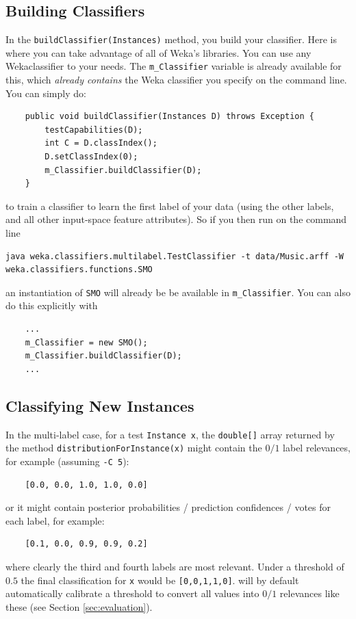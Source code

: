 \documentclass[11pt]{article}
\newcommand{\MEKA}{Meka}
\newcommand{\WEKA}{Weka}
\begin{document}
\subsection{Building Classifiers}

In the \texttt{buildClassifier(Instances)} method, you build your classifier. Here is where you can take advantage of all of \WEKA's libraries. You can use any \WEKA classifier to your needs. The \texttt{m\_Classifier} variable is already available for this, which \textit{already contains} the \WEKA{} classifier you specify on the command line. You can simply do:
\begin{verbatim}
    public void buildClassifier(Instances D) throws Exception {
        testCapabilities(D);
        int C = D.classIndex();
		D.setClassIndex(0);
		m_Classifier.buildClassifier(D);
    }
\end{verbatim}
to train a classifier to learn the first label of your data (using the other labels, and all other input-space feature attributes). So if you then run on the command line
\begin{verbatim}
java weka.classifiers.multilabel.TestClassifier -t data/Music.arff -W weka.classifiers.functions.SMO
\end{verbatim}
an instantiation of \texttt{SMO} will already be be available in \texttt{m_Classifier}. You can also do this explicitly with
\begin{verbatim}
	...
    m_Classifier = new SMO();
	m_Classifier.buildClassifier(D);
	...
\end{verbatim}

\subsection{Classifying New Instances}

In the multi-label case, for a test \texttt{Instance x}, the \texttt{double[]} array returned by the method \texttt{distributionForInstance(x)} might contain the $0/1$ label relevances, for example (assuming \texttt{-C 5}):
\begin{verbatim}
	[0.0, 0.0, 1.0, 1.0, 0.0]
\end{verbatim} 
or it might contain posterior probabilities / prediction confidences / votes for each label, for example:
\begin{verbatim}
	[0.1, 0.0, 0.9, 0.9, 0.2]
\end{verbatim} 
where clearly the third and fourth labels are most relevant. Under a threshold of $0.5$ the final classification for \texttt{x} would be \texttt{[0,0,1,1,0]}. \framework{\MEKA} will by default automatically calibrate a threshold to convert all values into $0/1$ relevances like these (see Section \ref{sec:evaluation}). 
\end{document}
